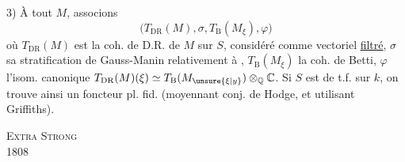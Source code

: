 3) À tout $M$, associons
\[
\bigl(T_{\mathrm{DR}}(M),\sigma,T_{\mathrm B}(M_\xi),\varphi\bigr)
\]
où $T_{\mathrm{DR}}(M)$ est la coh. de D.R. de $M$ sur $S$, considéré comme vectoriel \uline{filtré}, $\sigma$ sa stratification de Gauss-Manin relativement à , $T_{\mathrm B}(M_\xi)$ la coh. de Betti,
$\varphi$ l'isom. canonique $T_{\mathrm{DR}}(M)(\xi)\simeq T_{\mathrm B}(M_{\unsure{\xi|y}})\otimes_{\mathbb Q}\mathbb C$. Si $S$ est de t.f. sur $k$, on trouve ainsi un foncteur pl. fid. (moyennant conj. de Hodge, et utilisant Griffiths).
\par\noindent\textsc{Extra Strong}\\
 1808

